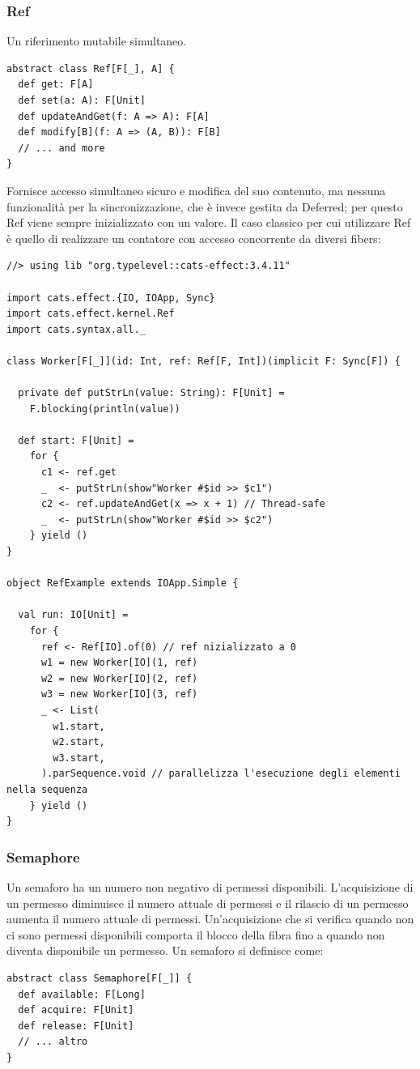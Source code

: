 \subsubsection{Ref}
Un riferimento mutabile simultaneo.
\begin{verbatim}
abstract class Ref[F[_], A] {
  def get: F[A]
  def set(a: A): F[Unit]
  def updateAndGet(f: A => A): F[A]
  def modify[B](f: A => (A, B)): F[B]
  // ... and more
}
\end{verbatim}
Fornisce accesso simultaneo sicuro e modifica del suo contenuto, ma nessuna funzionalità per la sincronizzazione, che è invece gestita da Deferred; per questo Ref viene sempre inizializzato con un valore. Il caso classico per cui utilizzare Ref è quello di realizzare un contatore con accesso concorrente da diversi fibers:

\begin{verbatim}
//> using lib "org.typelevel::cats-effect:3.4.11"

import cats.effect.{IO, IOApp, Sync}
import cats.effect.kernel.Ref
import cats.syntax.all._

class Worker[F[_]](id: Int, ref: Ref[F, Int])(implicit F: Sync[F]) {

  private def putStrLn(value: String): F[Unit] =
    F.blocking(println(value))

  def start: F[Unit] =
    for {
      c1 <- ref.get
      _  <- putStrLn(show"Worker #$id >> $c1")
      c2 <- ref.updateAndGet(x => x + 1) // Thread-safe
      _  <- putStrLn(show"Worker #$id >> $c2")
    } yield ()
}

object RefExample extends IOApp.Simple {

  val run: IO[Unit] =
    for {
      ref <- Ref[IO].of(0) // ref nizializzato a 0
      w1 = new Worker[IO](1, ref)
      w2 = new Worker[IO](2, ref)
      w3 = new Worker[IO](3, ref)
      _ <- List(
        w1.start,
        w2.start,
        w3.start,
      ).parSequence.void // parallelizza l'esecuzione degli elementi nella sequenza
    } yield ()
}
\end{verbatim}

\subsubsection{Semaphore}
Un semaforo ha un numero non negativo di permessi disponibili. L'acquisizione di un permesso diminuisce il numero attuale di permessi e il rilascio di un permesso aumenta il numero attuale di permessi. Un'acquisizione che si verifica quando non ci sono permessi disponibili comporta il blocco della fibra fino a quando non diventa disponibile un permesso. Un semaforo si definisce come:
\begin{verbatim}
abstract class Semaphore[F[_]] {
  def available: F[Long]
  def acquire: F[Unit]
  def release: F[Unit]
  // ... altro
}
    
\end{verbatim}

